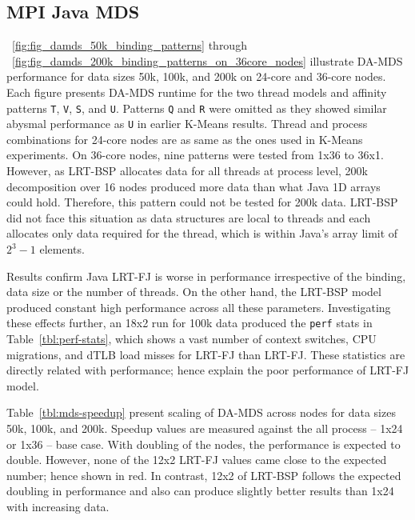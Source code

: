 \documentclass[10pt, conference, compsocconf]{IEEEtran}
\begin{document}
\subsection{MPI Java \ac{MDS}}
\figurename~\ref{fig:fig_damds_50k_binding_patterns} through \figurename~\ref{fig:fig_damds_200k_binding_patterns_on_36core_nodes} illustrate \ac{DA-MDS} performance for data sizes 50k, 100k, and 200k on 24-core and 36-core nodes. Each figure presents \ac{DA-MDS} runtime for the two thread models and affinity patterns \texttt{T}, \texttt{V}, \texttt{S}, and \texttt{U}. Patterns \texttt{Q} and \texttt{R} were omitted as they showed similar abysmal performance as \texttt{U} in earlier K-Means results. Thread and process combinations for 24-core nodes are as same as the ones used in K-Means experiments. On 36-core nodes, nine patterns were tested from 1x36 to 36x1. However, as \ac{LRT-BSP} allocates data for all threads at process level, 200k decomposition over 16 nodes produced more data than what Java 1D arrays could hold. Therefore, this pattern could not be tested for 200k data. \ac{LRT-BSP} did not face this situation as data structures are local to threads and each allocates only data required for the thread, which is within Java's array limit of $2^{3} - 1$ elements.

Results confirm Java \ac{LRT-FJ} is worse in performance irrespective of the binding, data size or the number of threads. On the other hand, the \ac{LRT-BSP} model produced constant high performance across all these parameters. Investigating these effects further, an 18x2 run for 100k data produced the \texttt{perf} stats in Table~\ref{tbl:perf-stats}, which shows a vast number of context switches, \acs{CPU} migrations, and \acl{dTLB} load misses for \ac{LRT-FJ} than \ac{LRT-FJ}. These statistics are directly related with performance; hence explain the poor performance of \ac{LRT-FJ} model.

Table~\ref{tbl:mds-speedup} present scaling of \ac{DA-MDS} across nodes for data sizes 50k, 100k, and 200k. Speedup values are measured against the all process -- 1x24 or 1x36 -- base case. With doubling of the nodes, the performance is expected to double. However, none of the 12x2 \ac{LRT-FJ} values came close to the expected number; hence shown in red.  In contrast, 12x2 of \ac{LRT-BSP} follows the expected doubling in performance and also can produce slightly better results than 1x24 with increasing data.
\end{document}
